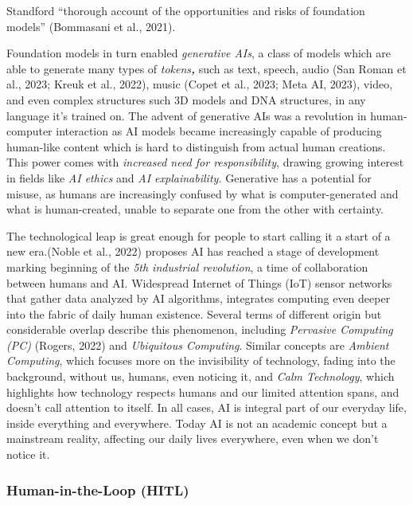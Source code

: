 \documentclass[
  letterpaper,
  DIV=11,
  numbers=noendperiod]{scrartcl}
\begin{document}
Standford ``thorough account of the opportunities and risks of
foundation models'' (Bommasani et al., 2021).

Foundation models in turn enabled \emph{generative AIs}, a class of
models which are able to generate many types of \emph{tokens\textbf{,}}
such as text, speech, audio (San Roman et al., 2023; Kreuk et al.,
2022), music (Copet et al., 2023; Meta AI, 2023), video, and even
complex structures such 3D models and DNA structures, in any language
it's trained on. The advent of generative AIs was a revolution in
human-computer interaction as AI models became increasingly capable of
producing human-like content which is hard to distinguish from actual
human creations. This power comes with \emph{increased need for
responsibility}, drawing growing interest in fields like \emph{AI
ethics} and \emph{AI explainability.} Generative has a potential for
misuse, as humans are increasingly confused by what is
computer-generated and what is human-created, unable to separate one
from the other with certainty.

The technological leap is great enough for people to start calling it a
start of a new era.(Noble et al., 2022) proposes AI has reached a stage
of development marking beginning of the \emph{5th industrial
revolution}, a time of collaboration between humans and AI. Widespread
Internet of Things (IoT) sensor networks that gather data analyzed by AI
algorithms, integrates computing even deeper into the fabric of daily
human existence. Several terms of different origin but considerable
overlap describe this phenomenon, including \emph{Pervasive Computing
(PC)} (Rogers, 2022) and \emph{Ubiquitous Computing}. Similar concepts
are \emph{Ambient Computing}, which focuses more on the invisibility of
technology, fading into the background, without us, humans, even
noticing it, and \emph{Calm Technology}, which highlights how technology
respects humans and our limited attention spans, and doesn't call
attention to itself. In all cases, AI is integral part of our everyday
life, inside everything and everywhere. Today AI is not an academic
concept but a mainstream reality, affecting our daily lives everywhere,
even when we don't notice it.

\subsubsection{\texorpdfstring{\textbf{Human-in-the-Loop
(HITL)}}{Human-in-the-Loop (HITL)}}\label{human-in-the-loop-hitl}
\end{document}
